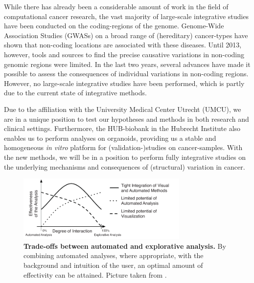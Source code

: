 \documentclass[twoside,fontsize=12pt]{article}
\begin{document}
\noindent
While there has already been a considerable amount of work in the field of computational cancer research, the vast majority of large-scale integrative studies have been conducted on the coding-regions of the genome\cite{ENCODE}. Genome-Wide Association Studies (GWASs) on a broad range of (hereditary) cancer-types have shown that non-coding locations are associated with these diseases. Until 2013, however, tools and sources to find the precise causative variations in non-coding genomic regions were limited. In the last two years, several advances have made it possible to assess the consequences of individual variations in non-coding regions\cite{Ongen2014,Khurana2013}. However, no large-scale integrative studies have been performed, which is partly due to the current state of integrative methods. 

Due to the affiliation with the University Medical Center Utrecht (UMCU), we are in a unique position to test our hypotheses and methods in both research and clinical settings. Furthermore, the HUB-biobank in the Hubrecht Institute also enables us to perform analyses on organoids, providing us a stable and homogeneous \textit{in vitro} platform for (validation-)studies on cancer-samples. With the new methods, we will be in a position to perform fully integrative studies on the underlying mechanisms and consequences of (structural) variation in cancer.
\medskip
\begin{figure}[h!]
    \centering
    \includegraphics[width=0.75\textwidth]{autoVSexplo}
    \caption{\textbf{Trade-offs between automated and explorative analysis.} By combining automated analyses, where appropriate, with the background and intuition of the user, an optimal amount of effectivity can be attained. Picture taken from \citet{Keim}.}
    \label{fig:ae}
\end{figure}
\end{document}
